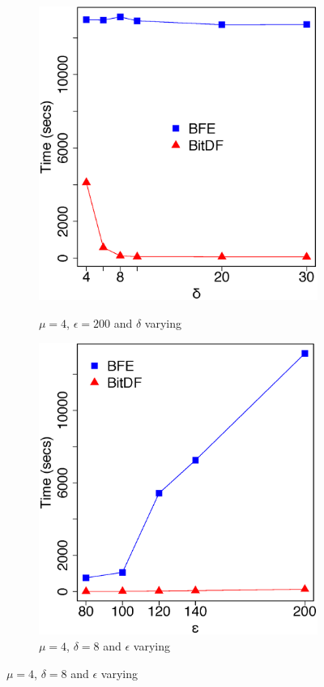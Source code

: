 {\begin{figure}[h!]
    \centering
    \caption{Results varying $\delta$ and $\epsilon$ for Brinkhoff dataset}
    \begin{subfigure}[t]{0.48\textwidth}
        \caption{$\mu = 4$, $\epsilon = 200$ and $\delta$ varying}
        \includegraphics[width=\textwidth]{images/Brinkhoff_n_4_g_200_varying_l.eps}
        \label{fig:brinkhoff_vary_l}
    \end{subfigure}
    \begin{subfigure}[t]{0.48\textwidth}
        \caption{$\mu = 4$, $\delta = 8$ and $\epsilon$ varying}
        \includegraphics[width=\textwidth]{images/Brinkhoff_n_4_l_8_varying_g.eps}

\end{subfigure}
\end{figure}}
